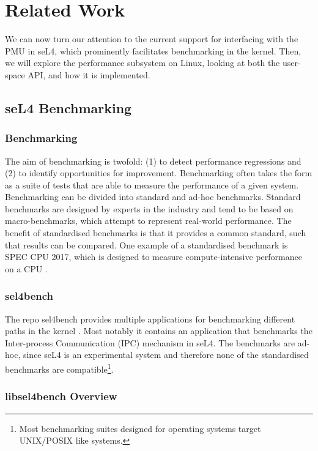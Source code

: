\chapter{Related Work}\label{ch:relatedwork}

We can now turn our attention to the current support for interfacing with the PMU in seL4, which prominently facilitates benchmarking in the kernel. Then, we will explore the performance subsystem on Linux, looking at both the user-space API, and how it is implemented.

\section{seL4 Benchmarking}

\subsection{Benchmarking}

The aim of benchmarking is twofold: (1) to detect performance regressions and (2) to identify opportunities for improvement. Benchmarking often takes the form as a suite of tests that are able to measure the performance of a given system. Benchmarking can be divided into standard and ad-hoc benchmarks. Standard benchmarks are designed by experts in the industry and tend to be based on macro-benchmarks, which attempt to represent real-world performance. The benefit of standardised benchmarks is that it provides a common standard, such that results can be compared. One example of a standardised benchmark is SPEC CPU 2017, which is designed to measure compute-intensive performance on a CPU \cite{SPECCPU2017}.

\subsection{sel4bench}

The repo sel4bench provides multiple applications for benchmarking different paths in the kernel \cite{GithubSel4bench}. Most notably it contains an application that benchmarks the Inter-process Communication (IPC) mechanism in seL4. The benchmarks are ad-hoc, since seL4 is an experimental system and therefore none of the standardised benchmarks are compatible\footnote{Most benchmarking suites designed for operating systems target UNIX/POSIX like systems.}.

\subsection{libsel4bench Overview}\label{sect:libsel4bench}

